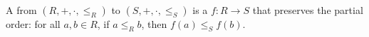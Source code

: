 \begin{definition} \label{definition:homomorphism_of_ordered_rings}
    A  from $(R,+,\cdot,\leq_R)$ to $(S,+,\cdot,\leq_S)$ is a  $f : R \to S$ that preserves the partial order: for all $a,b \in R$, if $a \leq_R b$, then $f(a) \leq_S f(b)$.
\end{definition}